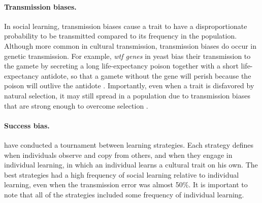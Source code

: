 \documentclass[11pt]{article}
\begin{document}
\paragraph{Transmission biases.}
In social learning, transmission biases cause a trait to have a disproportionate probability to be transmitted compared to its frequency in the population.
Although more common in cultural transmission, transmission biases do occur in genetic transmission. For example, \textit{wtf genes} in yeast bias their transmission to the gamete by secreting a long life-expectancy poison together with a short life-expectancy antidote, so that a gamete without the gene will perish because the poison will outlive the antidote \citep{wtfGene}.
Importantly, even when a trait is disfavored by natural selection, it may still spread in a population due to transmission biases that are strong enough to overcome selection \citep[Ch. 8 pg. 279]{evolutionBook}.

\paragraph{Success bias.}
\citet{strategiesPaper} have conducted a tournament between learning strategies. Each strategy defines when individuals observe and copy from others, and when they engage in individual learning, in which an individual learns a cultural trait on his own. The best strategies had a high frequency of social learning relative to individual learning, even when the transmission error was almost 50\%. It is important to note that all of the strategies included some frequency of individual learning. 

\end{document}
